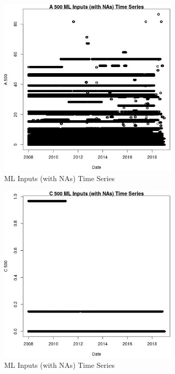 \begin{figure} 
\centering  
\includegraphics[width=0.77\textwidth]{Code_Outputs/Report_ML_input_PM25_Step4_part_e_de_duplicated_aves_compiled_2019-05-21wNAs_A_500vDate.jpg} 
\caption{\label{fig:Report_ML_input_PM25_Step4_part_e_de_duplicated_aves_compiled_2019-05-21wNAsA_500vDate}ML Inputs (with NAs) Time Series} 
\end{figure} 
 

\begin{figure} 
\centering  
\includegraphics[width=0.77\textwidth]{Code_Outputs/Report_ML_input_PM25_Step4_part_e_de_duplicated_aves_compiled_2019-05-21wNAs_C_500vDate.jpg} 
\caption{\label{fig:Report_ML_input_PM25_Step4_part_e_de_duplicated_aves_compiled_2019-05-21wNAsC_500vDate}ML Inputs (with NAs) Time Series} 
\end{figure} 
 

